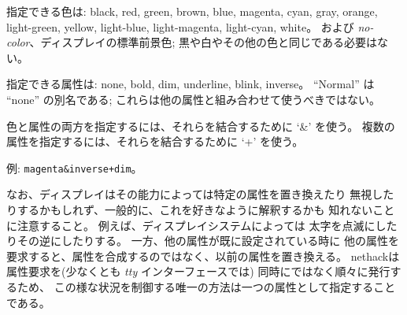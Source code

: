 指定できる色は:
black, red, green, brown, blue, magenta, cyan, gray,
orange, light-green, yellow, light-blue, light-magenta, light-cyan, white。
および {\it no-color}、ディスプレイの標準前景色;
黒や白やその他の色と同じである必要はない。

指定できる属性は:
none, bold, dim, underline, blink, inverse。
``Normal'' は ``none'' の別名である;
これらは他の属性と組み合わせて使うべきではない。

色と属性の両方を指定するには、それらを結合するために `\&' を使う。
複数の属性を指定するには、それらを結合するために `+' を使う。

例: {\tt magenta\&inverse+dim}。

なお、ディスプレイはその能力によっては特定の属性を置き換えたり
無視したりするかもしれず、一般的に、これを好きなように解釈するかも
知れないことに注意すること。
例えば、ディスプレイシステムによっては
太字を点滅にしたりその逆にしたりする。
一方、他の属性が既に設定されている時に
他の属性を要求すると、属性を合成するのではなく、以前の属性を置き換える。
nethackは属性要求を(少なくとも {\it tty}  インターフェースでは)
同時にではなく順々に発行するため、
この様な状況を制御する唯一の方法は一つの属性として指定することである。


